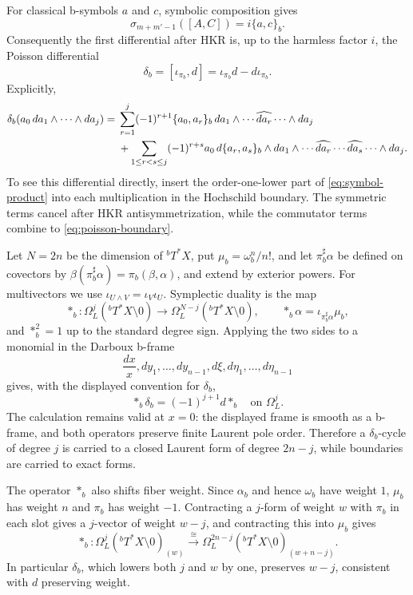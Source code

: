 \documentclass[11pt,oneside,reqno]{article}
\newcommand{\Tbstar}{{}^{b}T^*X}
\theoremstyle{plain}
\theoremstyle{definition}
\theoremstyle{remark}
\begin{document}
For classical b-symbols \(a\) and \(c\), symbolic composition gives
\[
 \sigma_{m+m'-1}([A,C])
 =i\{a,c\}_b.
\]
Consequently the first differential after HKR is, up to the harmless factor
\(i\), the Poisson differential
\[
 \delta_b=[\iota_{\pi_b},d]
 =\iota_{\pi_b}d-d\iota_{\pi_b}.
\]
Explicitly,
\begin{align}\label{eq:poisson-boundary}
 \delta_b(a_0\,da_1\wedge\cdots\wedge da_j)
 ={}&\sum_{r=1}^j(-1)^{r+1}\{a_0,a_r\}_b
       \,da_1\wedge\cdots\widehat{da_r}\cdots\wedge da_j\notag\\
 &+\sum_{1\leq r<s\leq j}(-1)^{r+s}a_0\,d\{a_r,a_s\}_b
       \wedge da_1\wedge\cdots
       \widehat{da_r}\cdots\widehat{da_s}\cdots\wedge da_j.
\end{align}
To see this differential directly, insert the order-one-lower part of
\eqref{eq:symbol-product} into each multiplication in the Hochschild
boundary. The symmetric terms cancel after HKR antisymmetrization, while the
commutator terms combine to \eqref{eq:poisson-boundary}.

Let \(N=2n\) be the dimension of \(\Tbstar\), put
\(\mu_b=\omega_b^n/n!\), and let
\(\pi_b^\sharp\alpha\) be defined on covectors by
\(\beta(\pi_b^\sharp\alpha)=\pi_b(\beta,\alpha)\), and extend by exterior
powers. For multivectors we use \(\iota_{U\wedge V}=\iota_V\iota_U\). Symplectic duality is the map
\[
 *_b:\Omega_L^j(\Tbstar\setminus0)
 \longrightarrow
 \Omega_L^{N-j}(\Tbstar\setminus0),
 \qquad *_b\alpha=\iota_{\pi_b^\sharp\alpha}\mu_b,
\]
and \(*_b^2=1\) up to the standard degree sign. Applying the two sides to a
monomial in the Darboux b-frame
\[
 \frac{dx}{x},dy_1,\ldots,dy_{n-1},d\xi,d\eta_1,\ldots,d\eta_{n-1}
\]
gives, with the displayed convention for \(\delta_b\),
\begin{equation}\label{eq:symplectic-duality}
 *_b\delta_b=(-1)^{j+1}d*_b
 \quad\text{on }\Omega_L^j.
\end{equation}
The calculation remains valid at \(x=0\): the displayed frame is smooth as a
b-frame, and both operators preserve finite Laurent pole order. Therefore a
\(\delta_b\)-cycle of degree \(j\) is carried to a closed Laurent form of
degree \(2n-j\), while boundaries are carried to exact forms.

The operator \(*_b\) also shifts fiber weight. Since \(\alpha_b\) and hence
\(\omega_b\) have weight \(1\), \(\mu_b\) has weight \(n\) and \(\pi_b\) has
weight \(-1\). Contracting a \(j\)-form of weight \(w\) with \(\pi_b\) in
each slot gives a \(j\)-vector of weight \(w-j\), and contracting this
into \(\mu_b\) gives
\begin{equation}\label{eq:weight-shift}
 *_b:\Omega_L^j(\Tbstar\setminus0)_{(w)}
 \xrightarrow{\;\cong\;}
 \Omega_L^{2n-j}(\Tbstar\setminus0)_{(w+n-j)} .
\end{equation}
In particular \(\delta_b\), which lowers both \(j\) and \(w\) by one,
preserves \(w-j\), consistent with \(d\) preserving weight.
\end{document}
